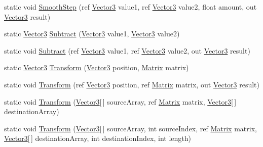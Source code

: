 \begin{DoxyCompactItemize}
static void \hyperlink{structMicrosoft_1_1Xna_1_1Framework_1_1Vector3_aa2fb584e4e05c0639a485a8671227262}{Smooth\+Step} (ref \hyperlink{structMicrosoft_1_1Xna_1_1Framework_1_1Vector3}{Vector3} value1, ref \hyperlink{structMicrosoft_1_1Xna_1_1Framework_1_1Vector3}{Vector3} value2, float amount, out \hyperlink{structMicrosoft_1_1Xna_1_1Framework_1_1Vector3}{Vector3} result)
\item 
static \hyperlink{structMicrosoft_1_1Xna_1_1Framework_1_1Vector3}{Vector3} \hyperlink{structMicrosoft_1_1Xna_1_1Framework_1_1Vector3_aca781dc70b0e4e2fdf30cfbc5068dc58}{Subtract} (\hyperlink{structMicrosoft_1_1Xna_1_1Framework_1_1Vector3}{Vector3} value1, \hyperlink{structMicrosoft_1_1Xna_1_1Framework_1_1Vector3}{Vector3} value2)
\item 
static void \hyperlink{structMicrosoft_1_1Xna_1_1Framework_1_1Vector3_af4606d13dd09e43cdc0f8a7a2983c75d}{Subtract} (ref \hyperlink{structMicrosoft_1_1Xna_1_1Framework_1_1Vector3}{Vector3} value1, ref \hyperlink{structMicrosoft_1_1Xna_1_1Framework_1_1Vector3}{Vector3} value2, out \hyperlink{structMicrosoft_1_1Xna_1_1Framework_1_1Vector3}{Vector3} result)
\item 
static \hyperlink{structMicrosoft_1_1Xna_1_1Framework_1_1Vector3}{Vector3} \hyperlink{structMicrosoft_1_1Xna_1_1Framework_1_1Vector3_af5d0a3a24562f890f35abf05a9d2228a}{Transform} (\hyperlink{structMicrosoft_1_1Xna_1_1Framework_1_1Vector3}{Vector3} position, \hyperlink{structMicrosoft_1_1Xna_1_1Framework_1_1Matrix}{Matrix} matrix)
\item 
static void \hyperlink{structMicrosoft_1_1Xna_1_1Framework_1_1Vector3_a5d2dcbf4317000adcb60414ff5549eae}{Transform} (ref \hyperlink{structMicrosoft_1_1Xna_1_1Framework_1_1Vector3}{Vector3} position, ref \hyperlink{structMicrosoft_1_1Xna_1_1Framework_1_1Matrix}{Matrix} matrix, out \hyperlink{structMicrosoft_1_1Xna_1_1Framework_1_1Vector3}{Vector3} result)
\item 
static void \hyperlink{structMicrosoft_1_1Xna_1_1Framework_1_1Vector3_a07a2c52330c4ae40a61d221162cd5f11}{Transform} (\hyperlink{structMicrosoft_1_1Xna_1_1Framework_1_1Vector3}{Vector3}\mbox{[}$\,$\mbox{]} source\+Array, ref \hyperlink{structMicrosoft_1_1Xna_1_1Framework_1_1Matrix}{Matrix} matrix, \hyperlink{structMicrosoft_1_1Xna_1_1Framework_1_1Vector3}{Vector3}\mbox{[}$\,$\mbox{]} destination\+Array)
\item 
static void \hyperlink{structMicrosoft_1_1Xna_1_1Framework_1_1Vector3_a2eff55d60c107d2c7305e09d87592250}{Transform} (\hyperlink{structMicrosoft_1_1Xna_1_1Framework_1_1Vector3}{Vector3}\mbox{[}$\,$\mbox{]} source\+Array, int source\+Index, ref \hyperlink{structMicrosoft_1_1Xna_1_1Framework_1_1Matrix}{Matrix} matrix, \hyperlink{structMicrosoft_1_1Xna_1_1Framework_1_1Vector3}{Vector3}\mbox{[}$\,$\mbox{]} destination\+Array, int destination\+Index, int length)

\end{DoxyCompactItemize}
